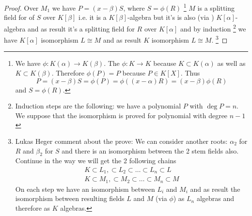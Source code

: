 \begin{theorem}
\begin{proof}
    Over $M_1$ we have $P = (x - \beta) S$, where
    $S = \phi\left(R\right)$
    \footnote{
      We have $\phi: K\left(\alpha\right) \to
      K\left(\beta\right)$. The $\phi: K \to K$ because
      $K \subset K\left(\alpha\right)$ as well as
      $K \subset K\left(\beta\right)$. Therefore
      $\phi\left(P\right) = P$ because $P \in K\left[X\right]$.
      Thus
      \[
      P = (x - \beta) S = \phi\left(P\right) =
      \phi\left((x - \alpha) R\right) =
      (x - \beta) \phi\left(R\right)
      \]
      and $S = \phi\left(R\right)$.
    }
    $M$ is a splitting field for of $S$ over $K\left[\beta\right]$
    i.e. it is a $K\left[\beta\right]$-algebra but it's is also (via
    ) $K\left[\alpha\right]$-algebra and as
    result it's a splitting field for $R$ over $K\left[\alpha\right]$
    and by induction
    \footnote{
      Induction steps are the following: we have a polynomial $P$ with
      $\deg P = n$. We suppose that the isomorphism is proved for
      polynomial with degree $n-1$
    }
    we have $K\left[\alpha\right]$ isomorphism $L \cong M$ and as
    result $K$ isomorphism $L \cong M$.
    \footnote{
      Lukas Heger comment about the prove:
      We can consider 
      another roots: $\alpha_2$ for $R$ and $\beta_2$ for $S$
      and there is an isomorphism between the 2 stem fields
      also. Continue in the way we will get the 2 following chains
      \begin{eqnarray}
        K \subset L_1, \subset L_2 \subset \dots \subset L_n \subset L
        \nonumber \\
        K \subset M_1, \subset M_2 \subset \dots \subset M_n \subset M
        \nonumber
      \end{eqnarray}
      On each step we have an isomorphism between $L_i$ and $M_i$ and as
      result the isomorphism between resulting fields $L$ and $M$ (via
      $\phi$) as $L_n$ algebras and therefore as $K$ algebras. 
    }
  \end{proof}
  \label{thm:lec2_1}
\end{theorem}

